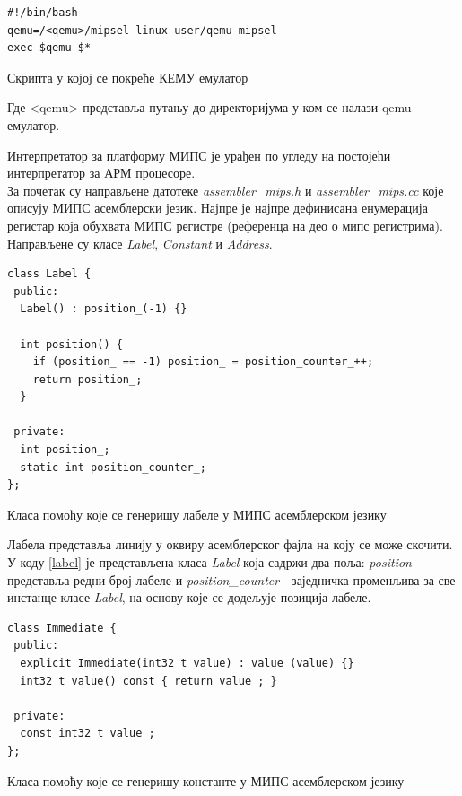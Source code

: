 \documentclass[12pt,oneside]{memoir}
\begin{document}
\begin{listing}
\centering
\begin{verbatim}
#!/bin/bash
qemu=/<qemu>/mipsel-linux-user/qemu-mipsel
exec $qemu $*
\end{verbatim}
\caption{Скрипта у којој се покреће КЕМУ емулатор}
\label{skripta}
\end{listing}
Где <qemu> представља путању до директоријума у ком се налази qemu емулатор.

Интерпретатор за платформу МИПС је урађен по угледу на постојећи интерпретатор за АРМ процесоре.\\
За почетак су направљене датотеке \textit{assembler\_mips.h} и \textit{assembler\_mips.cc} које описују МИПС асемблерски језик. Најпре је најпре дефинисана енумерација регистар која обухвата  МИПС регистре (референца на део о мипс регистрима). Направљене су класе \textit{Label}, \textit{Constant} и \textit{Address}. 

\begin{listing}
\begin{verbatim}
class Label {
 public:
  Label() : position_(-1) {}

  int position() {
    if (position_ == -1) position_ = position_counter_++;
    return position_;
  }

 private:
  int position_;
  static int position_counter_;
}; 
\end{verbatim}
\caption{Класа помоћу које се генеришу лабеле у МИПС асемблерском језику}
\label{label}
\end{listing}

Лабела представља линију у оквиру асемблерског фајла на коју се може скочити. У коду \ref{label} је представљена класа \textit{Label} која садржи два поља: \textit{position} - представља редни број лабеле и \textit{position\_counter} - заједничка променљива за све инстанце класе \textit{Label}, на основу које се додељује позиција лабеле.\\

\begin{listing}
\begin{verbatim}
class Immediate {
 public:
  explicit Immediate(int32_t value) : value_(value) {}
  int32_t value() const { return value_; }

 private:
  const int32_t value_;
};
\end{verbatim}
\caption{Класа помоћу које се генеришу константе у МИПС асемблерском језику}
\label{konstanta}
\end{listing}
\end{document}
